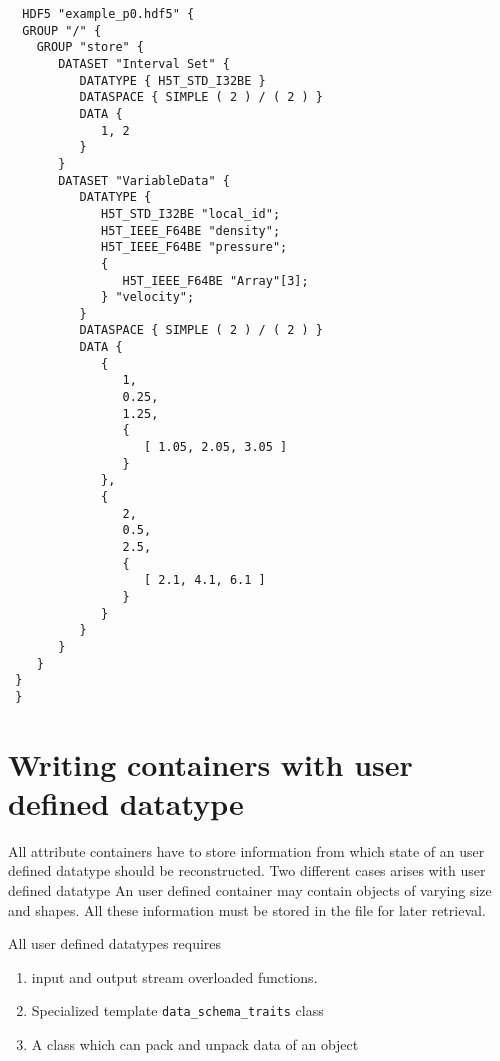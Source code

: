 \begin{verbatim}
  HDF5 "example_p0.hdf5" {
  GROUP "/" {
    GROUP "store" {
       DATASET "Interval Set" {
          DATATYPE { H5T_STD_I32BE }
          DATASPACE { SIMPLE ( 2 ) / ( 2 ) }
          DATA {
             1, 2
          }
       }
       DATASET "VariableData" {
          DATATYPE {
             H5T_STD_I32BE "local_id";
             H5T_IEEE_F64BE "density";
             H5T_IEEE_F64BE "pressure";
             {
                H5T_IEEE_F64BE "Array"[3];
             } "velocity";
          }
          DATASPACE { SIMPLE ( 2 ) / ( 2 ) }
          DATA {
             {
                1,
                0.25,
                1.25,
                {
                   [ 1.05, 2.05, 3.05 ]
                }
             },
             {
                2,
                0.5,
                2.5,
                {
                   [ 2.1, 4.1, 6.1 ]
                }
             }
          }
       }
    }
 }
 }
\end{verbatim}

\section { Writing containers with user defined datatype}
All attribute containers have to store information from which state of an user defined
datatype should be reconstructed. Two different cases arises with user defined datatype
An user defined container may contain objects of varying size and shapes. All these
information must be stored in the file for later retrieval. 

\par All user defined datatypes requires
\begin{enumerate}
\item  input and output stream overloaded functions.
\item  Specialized template {\tt data\_schema\_traits} class
\item  A class which can pack and unpack data of an object
\end{enumerate}

